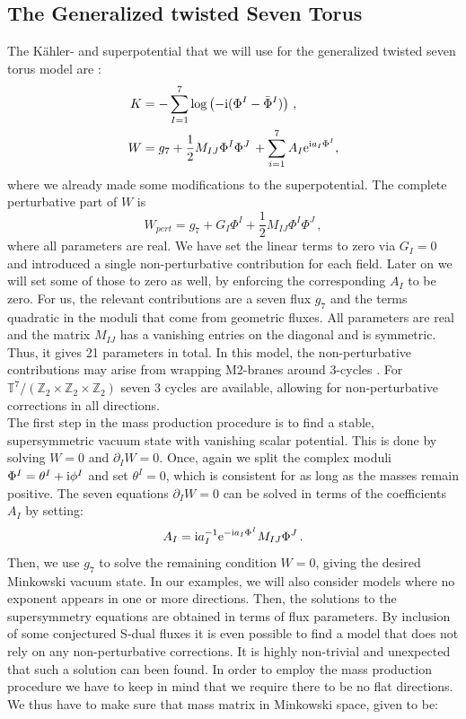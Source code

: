 \documentclass[a4paper,12pt,twoside,openright]{report}
\newcommand{\be}{\begin{equation}}
\newcommand{\ee}{\end{equation}}
\newcommand{\bea}{\begin{equation}\begin{aligned}}
\newcommand{\eea}{\end{aligned}\end{equation}}
\def\rmi{{\rm i}}
\def\rme{{\rm e}}
\begin{document}
\subsection{The Generalized twisted Seven Torus}
The Kähler- and superpotential that we will use for the generalized twisted seven torus model are \cite{DallAgata:2005zlf,Derendinger:2014wwa}:
\bea 
\label{eq:mtheorypots}
K &= - \sum_{I=1}^7 \log \left( -\rmi (\Phi^I - \bar{\Phi}^I)\right)\,,\\
W &=  g_7 + \frac{1}{2} M_{IJ} \Phi^I \Phi^J\, + \sum_{i=1}^7 A_I \rme ^{\rmi a_I \Phi^I},
\eea
where we already made some modifications to the superpotential. The complete perturbative part of $W$ is 
\be
W_{pert} =  g_7 + G_I \Phi^I + \frac{1}{2} M_{IJ} \Phi^I \Phi^J\,,
\ee
where all parameters are real. We have set the linear terms to zero via $G_I =0$ and introduced a single non-perturbative contribution for each field. Later on we will set some of those to zero as well, by enforcing the corresponding $A_I$ to be zero. For us, the relevant contributions are a seven flux $g_7$ and the terms quadratic in the moduli that come from geometric fluxes. All parameters are real and the matrix $M_{IJ}$ has a vanishing entries on the diagonal and is symmetric. Thus, it gives 21 parameters in total. In this model, the non-perturbative contributions may arise from wrapping M2-branes around 3-cycles \cite{Harvey:1999as}. For $\mathbb{T} ^7/(\mathbb{Z}_2 \times \mathbb{Z}_2 \times \mathbb{Z}_2)$ seven 3 cycles are available, allowing for non-perturbative corrections in all directions.\\
The first step in the mass production procedure is to find a stable, supersymmetric vacuum state with vanishing scalar potential. This is done by solving $W = 0$ and $\partial_I W = 0$. Once, again we split the complex moduli $\Phi^I = \theta^I + \rmi \phi^I$ and set $\theta^I=0$, which is consistent for as long as the masses remain positive. The seven equations $\partial_I W =0$ can be solved in terms of the coefficients $A_I$ by setting:
\be 
A_I = \rmi a^{-1}_I \rme^{-\rmi a_I \Phi^I} M_{IJ} \Phi^J\,.
\ee
Then, we use $g_7$ to solve the remaining condition $W=0$, giving the desired Minkowski vacuum state. In our examples, we will also consider models where no exponent appears in one or more directions. Then, the solutions to the supersymmetry equations are obtained in terms of flux parameters. By inclusion of some conjectured S-dual fluxes it is even possible to find a model that does not rely on any non-perturbative corrections. It is highly non-trivial and unexpected that such a solution can been found. In order to employ the mass production procedure we have to keep in mind that we require there to be no flat directions. We thus have to make sure that mass matrix in Minkowski space, given to be:
\end{document}
